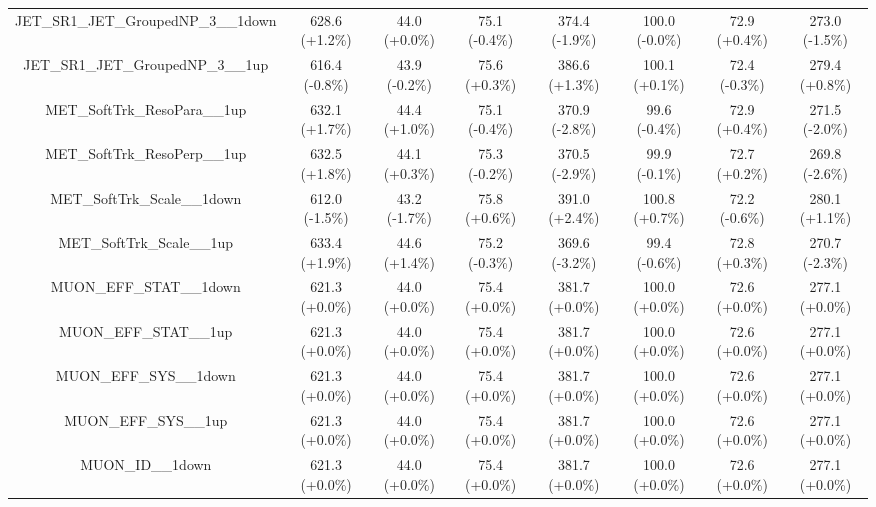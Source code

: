\begin{table}[htbp!]
\begin{tiny}
\begin{center}
\begin{tabular}{c|c|c|c||c|c|c|c}
JET\_SR1\_JET\_GroupedNP\_3\_\_1down                         & 628.6     (+1.2\%) & 44.0      (+0.0\%) & 75.1      (-0.4\%) & 374.4     (-1.9\%) & 100.0     (-0.0\%) & 72.9      (+0.4\%) & 273.0     (-1.5\%) \\ 
JET\_SR1\_JET\_GroupedNP\_3\_\_1up                           & 616.4     (-0.8\%) & 43.9      (-0.2\%) & 75.6      (+0.3\%) & 386.6     (+1.3\%) & 100.1     (+0.1\%) & 72.4      (-0.3\%) & 279.4     (+0.8\%) \\ 
MET\_SoftTrk\_ResoPara\_\_1up                                & 632.1     (+1.7\%) & 44.4      (+1.0\%) & 75.1      (-0.4\%) & 370.9     (-2.8\%) & 99.6      (-0.4\%) & 72.9      (+0.4\%) & 271.5     (-2.0\%) \\ 
MET\_SoftTrk\_ResoPerp\_\_1up                                & 632.5     (+1.8\%) & 44.1      (+0.3\%) & 75.3      (-0.2\%) & 370.5     (-2.9\%) & 99.9      (-0.1\%) & 72.7      (+0.2\%) & 269.8     (-2.6\%) \\ 
MET\_SoftTrk\_Scale\_\_1down                                 & 612.0     (-1.5\%) & 43.2      (-1.7\%) & 75.8      (+0.6\%) & 391.0     (+2.4\%) & 100.8     (+0.7\%) & 72.2      (-0.6\%) & 280.1     (+1.1\%) \\ 
MET\_SoftTrk\_Scale\_\_1up                                   & 633.4     (+1.9\%) & 44.6      (+1.4\%) & 75.2      (-0.3\%) & 369.6     (-3.2\%) & 99.4      (-0.6\%) & 72.8      (+0.3\%) & 270.7     (-2.3\%) \\ 
MUON\_EFF\_STAT\_\_1down                                     & 621.3     (+0.0\%) & 44.0      (+0.0\%) & 75.4      (+0.0\%) & 381.7     (+0.0\%) & 100.0     (+0.0\%) & 72.6      (+0.0\%) & 277.1     (+0.0\%) \\ 
MUON\_EFF\_STAT\_\_1up                                       & 621.3     (+0.0\%) & 44.0      (+0.0\%) & 75.4      (+0.0\%) & 381.7     (+0.0\%) & 100.0     (+0.0\%) & 72.6      (+0.0\%) & 277.1     (+0.0\%) \\ 
MUON\_EFF\_SYS\_\_1down                                      & 621.3     (+0.0\%) & 44.0      (+0.0\%) & 75.4      (+0.0\%) & 381.7     (+0.0\%) & 100.0     (+0.0\%) & 72.6      (+0.0\%) & 277.1     (+0.0\%) \\ 
MUON\_EFF\_SYS\_\_1up                                        & 621.3     (+0.0\%) & 44.0      (+0.0\%) & 75.4      (+0.0\%) & 381.7     (+0.0\%) & 100.0     (+0.0\%) & 72.6      (+0.0\%) & 277.1     (+0.0\%) \\ 
MUON\_ID\_\_1down                                            & 621.3     (+0.0\%) & 44.0      (+0.0\%) & 75.4      (+0.0\%) & 381.7     (+0.0\%) & 100.0     (+0.0\%) & 72.6      (+0.0\%) & 277.1     (+0.0\%) \\ 

\end{tabular}
\end{center}
\end{tiny}
\end{table}
